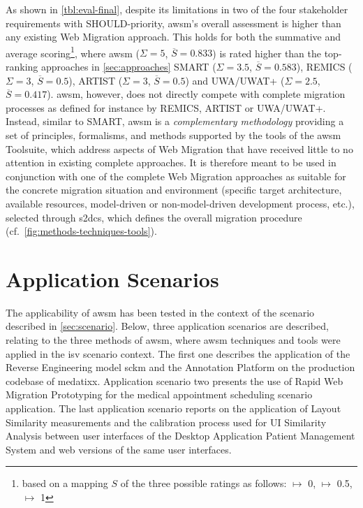 As shown in \cref{tbl:eval-final}, despite its limitations in two of the four stakeholder requirements with SHOULD-priority, \gls{awsm}'s overall assessment is higher than any existing \gls{Web Migration} approach.
This holds for both the summative and average scoring\footnote{based on a mapping \(S\) of the three possible ratings as follows: \Circle \(\mapsto\) 0, \LEFTcircle \(\mapsto\) 0.5, \CIRCLE \(\mapsto\) 1}, where \gls{awsm} (\(\Sigma=5\), \(\overline S=0.833\)) is rated higher than the top-ranking approaches in \cref{sec:approaches} SMART (\(\Sigma=3.5\), \(\overline S=0.583\)), REMICS (\(\Sigma=3\), \(\overline S=0.5\)), ARTIST (\(\Sigma=3\), \(\overline S=0.5\)) and UWA/UWAT+ (\(\Sigma=2.5\), \(\overline S=0.417\)).
\gls{awsm}, however, does not directly compete with complete migration processes as defined for instance by REMICS, ARTIST or UWA/UWAT+.
Instead, similar to SMART, \gls{awsm} is a \emph{complementary methodology} providing a set of principles, formalisms, and methods supported by the tools of the \gls{awsm} Toolsuite, which address aspects of \gls{Web Migration} that have received little to no attention in existing complete approaches.
It is therefore meant to be used in conjunction with one of the complete \gls{Web Migration} approaches as suitable for the concrete migration situation and environment (specific target architecture, available resources, model-driven or non-model-driven development process, etc.), selected through \gls{s2dcs}, which defines the overall migration procedure (cf.~\cref{fig:methods-techniques-tools}).

\section{Application Scenarios}
\vspace{10pt}

The applicability of \gls{awsm} has been tested in the context of the scenario described in \cref{sec:scenario}.
Below, three application scenarios are described, relating to the three methods of \gls{awsm}, where \gls{awsm} techniques and tools were applied in the \gls{isv} scenario context.
The first one describes the application of the \gls{Reverse Engineering} model \gls{sckm} and the Annotation Platform on the production codebase of medatixx.
Application scenario two presents the use of \gls{Rapid Web Migration Prototyping} for the medical appointment scheduling scenario application.
The last application scenario reports on the application of Layout Similarity measurements and the calibration process used for UI Similarity Analysis between user interfaces of the Desktop Application Patient Management System and \gls{web} versions of the same user interfaces.

